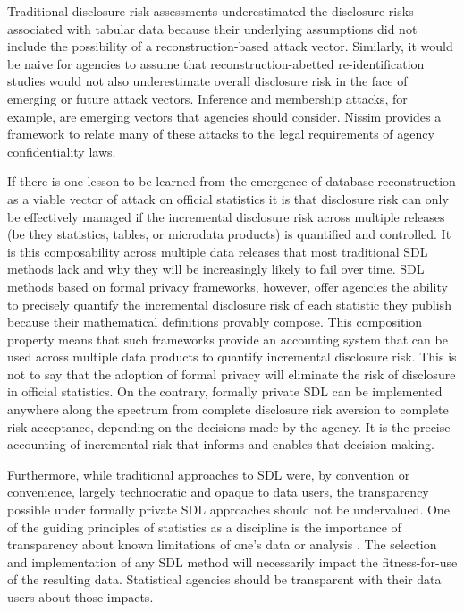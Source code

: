 Traditional disclosure risk assessments underestimated the disclosure risks associated with tabular data because their underlying assumptions did not include the possibility of a reconstruction-based attack vector. Similarly, it would be naive for agencies to assume that reconstruction-abetted re-identification studies would not also underestimate overall disclosure risk in the face of emerging or future attack vectors. Inference and membership attacks, for example, are emerging vectors that agencies should consider. Nissim \cite{nissim:2021} provides a framework to relate many of these attacks to the legal requirements of agency confidentiality laws.

If there is one lesson to be learned from the emergence of database reconstruction as a viable vector of attack on official statistics it is that disclosure risk can only be effectively managed if the incremental disclosure risk across multiple releases (be they statistics, tables, or microdata products) is quantified and controlled. It is this composability across multiple data releases that most traditional SDL methods lack and why they will be increasingly likely to fail over time. SDL methods based on formal privacy frameworks, however, offer agencies the ability to precisely quantify the incremental disclosure risk of each statistic they publish because their mathematical definitions provably compose. This composition property means that such frameworks provide an accounting system that can be used across multiple data products to quantify incremental disclosure risk. This is not to say that the adoption of formal privacy will eliminate the risk of disclosure in official statistics. On the contrary, formally private SDL can be implemented anywhere along the spectrum from complete disclosure risk aversion to complete risk acceptance, depending on the decisions made by the agency. It is the precise accounting of incremental risk that informs and enables that decision-making.

Furthermore, while traditional approaches to SDL were, by convention or convenience, largely technocratic and opaque to data users, the transparency possible under formally private SDL approaches should not be undervalued. One of the guiding principles of statistics as a discipline is the importance of transparency about known limitations of one's data or analysis \cite{asa:2022}. The selection and implementation of any SDL method will necessarily impact the fitness-for-use of the resulting data. Statistical agencies should be transparent with their data users about those impacts.

